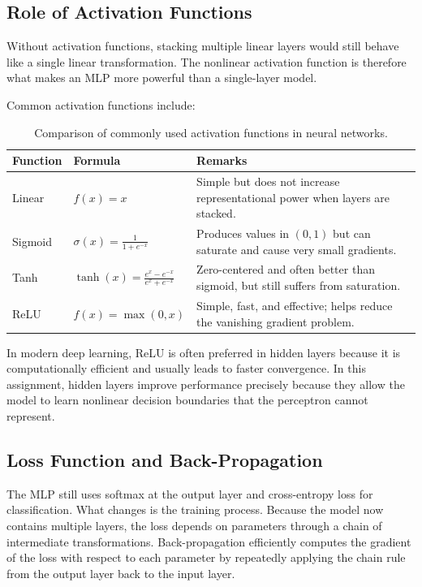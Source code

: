 \documentclass[11pt]{article}
\begin{document}
\subsection{Role of Activation Functions}

Without activation functions, stacking multiple linear layers would still behave like a single linear transformation. The nonlinear activation function is therefore what makes an MLP more powerful than a single-layer model.

Common activation functions include:

\begin{table}[H]
\centering
\begin{tabular}{p{2.5cm} p{3.0cm} p{7.0cm}}
\toprule
\textbf{Function} & \textbf{Formula} & \textbf{Remarks} \\
\midrule
Linear & $f(x)=x$ & Simple but does not increase representational power when layers are stacked. \\
Sigmoid & $\sigma(x)=\frac{1}{1+e^{-x}}$ & Produces values in $(0,1)$ but can saturate and cause very small gradients. \\
Tanh & $\tanh(x)=\frac{e^x-e^{-x}}{e^x+e^{-x}}$ & Zero-centered and often better than sigmoid, but still suffers from saturation. \\
ReLU & $f(x)=\max(0,x)$ & Simple, fast, and effective; helps reduce the vanishing gradient problem. \\
\bottomrule
\end{tabular}
\caption{Comparison of commonly used activation functions in neural networks.}
\label{tab:activations}
\end{table}

In modern deep learning, ReLU is often preferred in hidden layers because it is computationally efficient and usually leads to faster convergence. In this assignment, hidden layers improve performance precisely because they allow the model to learn nonlinear decision boundaries that the perceptron cannot represent.

\subsection{Loss Function and Back-Propagation}

The MLP still uses softmax at the output layer and cross-entropy loss for classification. What changes is the training process. Because the model now contains multiple layers, the loss depends on parameters through a chain of intermediate transformations. Back-propagation efficiently computes the gradient of the loss with respect to each parameter by repeatedly applying the chain rule from the output layer back to the input layer.
\end{document}
